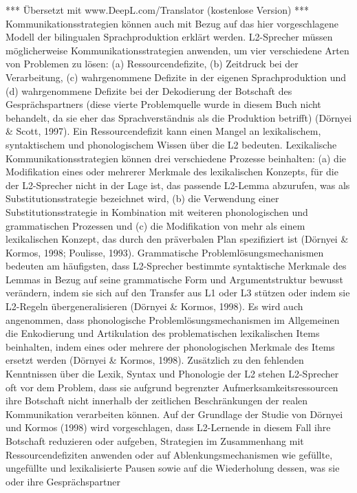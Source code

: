 \documentclass[
  letterpaper,
]{scrbook}
\begin{document}
*** Übersetzt mit www.DeepL.com/Translator (kostenlose Version) ***
Kommunikationsstrategien können auch mit Bezug auf das hier
vorgeschlagene Modell der bilingualen Sprachproduktion erklärt werden.
L2-Sprecher müssen möglicherweise Kommunikationsstrategien anwenden, um
vier verschiedene Arten von Problemen zu lösen: (a) Ressourcendefizite,
(b) Zeitdruck bei der Verarbeitung, (c) wahrgenommene Defizite in der
eigenen Sprachproduktion und (d) wahrgenommene Defizite bei der
Dekodierung der Botschaft des Gesprächspartners (diese vierte
Problemquelle wurde in diesem Buch nicht behandelt, da sie eher das
Sprachverständnis als die Produktion betrifft) (Dörnyei \& Scott, 1997).
Ein Ressourcendefizit kann einen Mangel an lexikalischem, syntaktischem
und phonologischem Wissen über die L2 bedeuten. Lexikalische
Kommunikationsstrategien können drei verschiedene Prozesse beinhalten:
(a) die Modifikation eines oder mehrerer Merkmale des lexikalischen
Konzepts, für die der L2-Sprecher nicht in der Lage ist, das passende
L2-Lemma abzurufen, was als Substitutionsstrategie bezeichnet wird, (b)
die Verwendung einer Substitutionsstrategie in Kombination mit weiteren
phonologischen und grammatischen Prozessen und (c) die Modifikation von
mehr als einem lexikalischen Konzept, das durch den präverbalen Plan
spezifiziert ist (Dörnyei \& Kormos, 1998; Poulisse, 1993). Grammatische
Problemlösungsmechanismen bedeuten am häufigsten, dass L2-Sprecher
bestimmte syntaktische Merkmale des Lemmas in Bezug auf seine
grammatische Form und Argumentstruktur bewusst verändern, indem sie sich
auf den Transfer aus L1 oder L3 stützen oder indem sie L2-Regeln
übergeneralisieren (Dörnyei \& Kormos, 1998). Es wird auch angenommen,
dass phonologische Problemlösungsmechanismen im Allgemeinen die
Enkodierung und Artikulation des problematischen lexikalischen Items
beinhalten, indem eines oder mehrere der phonologischen Merkmale des
Items ersetzt werden (Dörnyei \& Kormos, 1998). Zusätzlich zu den
fehlenden Kenntnissen über die Lexik, Syntax und Phonologie der L2
stehen L2-Sprecher oft vor dem Problem, dass sie aufgrund begrenzter
Aufmerksamkeitsressourcen ihre Botschaft nicht innerhalb der zeitlichen
Beschränkungen der realen Kommunikation verarbeiten können. Auf der
Grundlage der Studie von Dörnyei und Kormos (1998) wird vorgeschlagen,
dass L2-Lernende in diesem Fall ihre Botschaft reduzieren oder aufgeben,
Strategien im Zusammenhang mit Ressourcendefiziten anwenden oder auf
Ablenkungsmechanismen wie gefüllte, ungefüllte und lexikalisierte Pausen
sowie auf die Wiederholung dessen, was sie oder ihre Gesprächspartner
\end{document}
